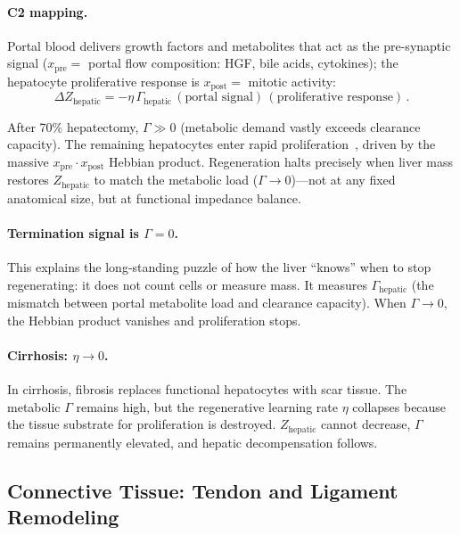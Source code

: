 \documentclass[aps,pre,twocolumn,superscriptaddress,floatfix]{revtex4-2}
\begin{document}
\paragraph{C2 mapping.}
Portal blood delivers growth factors and metabolites
that act as the pre-synaptic signal
($x_{\text{pre}} = $ portal flow composition:
HGF, bile acids, cytokines);
the hepatocyte proliferative response is
$x_{\text{post}} = $ mitotic activity:
\begin{equation}
  \Delta Z_{\text{hepatic}} =
  -\eta\,\Gamma_{\text{hepatic}}\,
  (\text{portal signal})\,
  (\text{proliferative response})\,.
  \label{eq:c2-hepatic}
\end{equation}

After 70\% hepatectomy, $\Gamma \gg 0$ (metabolic
demand vastly exceeds clearance capacity).
The remaining hepatocytes enter rapid
proliferation~\cite{Michalopoulos2007},
driven by the massive $x_{\text{pre}} \cdot
x_{\text{post}}$ Hebbian product.
Regeneration halts precisely when liver mass
restores $Z_{\text{hepatic}}$ to match the
metabolic load ($\Gamma \to 0$)---not at any
fixed anatomical size, but at functional
impedance balance.

\paragraph{Termination signal is $\Gamma = 0$.}
This explains the long-standing puzzle of how
the liver ``knows'' when to stop regenerating:
it does not count cells or measure mass.
It measures $\Gamma_{\text{hepatic}}$ (the
mismatch between portal metabolite load and
clearance capacity).  When $\Gamma \to 0$,
the Hebbian product vanishes and proliferation
stops.

\paragraph{Cirrhosis: $\eta \to 0$.}
In cirrhosis, fibrosis replaces functional
hepatocytes with scar tissue.
The metabolic $\Gamma$ remains high, but
the regenerative learning rate $\eta$
collapses because the tissue substrate for
proliferation is destroyed.
$Z_{\text{hepatic}}$ cannot decrease,
$\Gamma$ remains permanently elevated,
and hepatic decompensation follows.


\subsection{Connective Tissue: Tendon and Ligament Remodeling}
\label{sec:connective}
\end{document}
